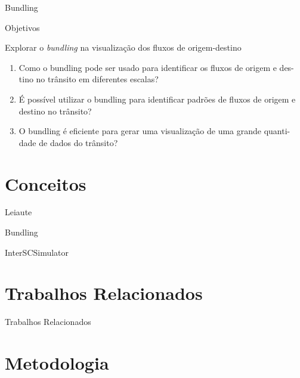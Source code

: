 
\begin{frame}[standout]
  Bundling
\end{frame}

\begin{frame}{Objetivos}
  \begin{block}{Explorar o \emph{bundling} na visualização dos fluxos de origem-destino}
    \begin{enumerate}
      \item Como o bundling pode ser usado para identificar os fluxos de origem e des-
tino no trânsito em diferentes escalas?

      \item É possível utilizar o bundling para identificar padrões de fluxos de origem
e destino no trânsito?

      \item O bundling é eficiente para gerar uma visualização de uma grande quanti-
dade de dados do trânsito?
    \end{enumerate}
  \end{block}
\end{frame}

\section{Conceitos}

\begin{frame}{Leiaute}
\end{frame}

\begin{frame}{Bundling}
\end{frame}

\begin{frame}{InterSCSimulator}
\end{frame}


\section{Trabalhos Relacionados}

\begin{frame}{Trabalhos Relacionados}
\end{frame}

\section{Metodologia}

